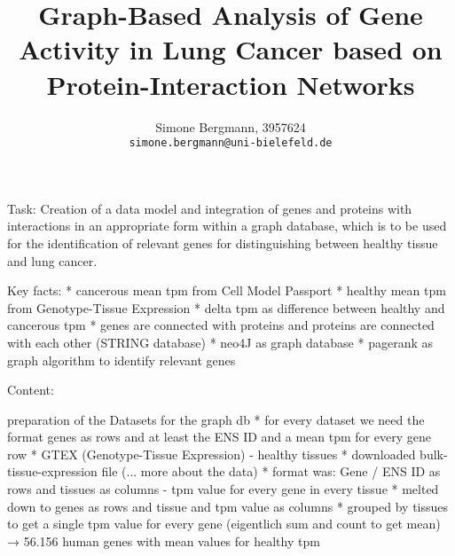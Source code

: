 \documentclass[11pt,a4paper]{article}
\title{Graph-Based Analysis of Gene Activity in Lung Cancer based on Protein-Interaction Networks}
\author{
Simone Bergmann, 3957624 \\
\texttt{simone.bergmann@uni-bielefeld.de}%
}
\begin{document}
\maketitle


\cite{page1999pagerank}

Task:
Creation of a data model and integration of genes and proteins with interactions in an appropriate form within a graph database,
which is to be used for the identification of relevant genes for distinguishing between healthy tissue and lung cancer.

Key facts:
* cancerous mean tpm from Cell Model Passport
* healthy mean tpm from Genotype-Tissue Expression
* delta tpm as difference between healthy and cancerous tpm
* genes are connected with proteins and proteins are connected with each other (STRING database)
* neo4J as graph database
* pagerank as graph algorithm to identify relevant genes
















Content:

preparation of the Datasets for the graph db
* for every dataset we need the format genes as rows and at least the ENS ID and a mean tpm for every gene row
    * GTEX (Genotype-Tissue Expression) - healthy tissues
        * downloaded bulk-tissue-expression file (... more about the data)
        * format was: Gene / ENS ID as rows and tissues as columns - tpm value for every gene in every tissue
        * melted down to genes as rows and tissue and tpm value as columns
        * grouped by tissues to get a single tpm value for every gene (eigentlich sum and count to get mean)
    → 56.156 human genes with mean values for healthy tpm
\end{document}

